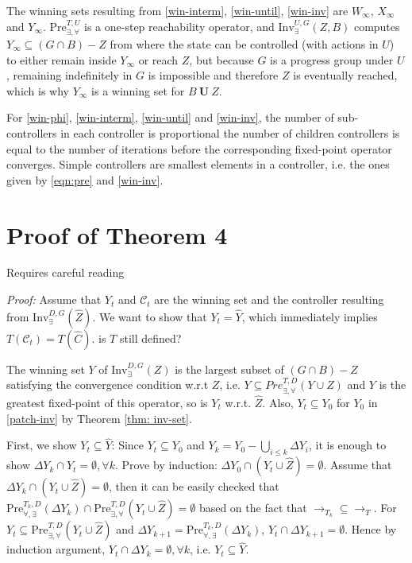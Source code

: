 The winning sets {\color{black} resulting from} \eqref{win-interm}, \eqref{win-until}, \eqref{win-inv} are $ W_{\infty} $, $ X_{\infty} $ and $ Y_{\infty} $. {\color{black} $\text{Pre}_{\exists,\forall}^{T,U}$ is a one-step reachability operator, and $\text{Inv}_{\exists}^{U,G}(Z,B)$ computes $Y_\infty \subseteq (G\cap B) - Z$ from where the state can be controlled (with actions in $U$) to either remain inside $Y_\infty$ or reach $Z$, but because $G$ is a progress group under $U$, remaining indefinitely in $G$ is impossible and therefore $Z$ is
	eventually reached, which is why $Y_\infty$ is a winning set for $B\mathbf{\ U\ }Z$.}
    
    For \eqref{win-phi}, \eqref{win-interm}, \eqref{win-until} and \eqref{win-inv}, the number of sub-controllers in each controller is proportional 
    {\color{purple} the number of children controllers is equal} 
    to the number of iterations before the corresponding fixed-point operator converges. Simple controllers are smallest elements in a controller, i.e. the ones given by \eqref{eqn:pre} and \eqref{win-inv}. 
    
    \section{Proof of Theorem 4}\label{app:pr-31}
    
    {\color{red} Requires careful reading}

\emph{Proof:} Assume that $ Y_t $ and $ \mathcal{C}_t $ are the winning set and the controller resulting from $ \text{Inv}_{\exists}^{D,G} (\widehat{Z}) $. We want to show that $ Y_t=\widehat{Y}$, which immediately implies $ T(\mathcal{C}_t) = T(\widehat{C}) $. {\color{red} is $T$ still defined?}
	
The winning set $ Y $ of $ \text{Inv}_{\exists}^{D,G} (Z) $ is the largest subset of $ (G\cap B) - Z  $ satisfying the convergence condition w.r.t $ Z $, i.e. $ Y \subseteq Pre^{T,D}_{\exists, \forall}(Y\cup Z) $ and $Y$ is the greatest fixed-point of this operator, so is $ Y_t $ w.r.t. $ \widehat{Z} $. Also, $ Y_t \subseteq Y_0 $ for $ Y_0 $ in \eqref{patch-inv} by Theorem \ref{thm: inv-set}. 
	
	First, we show $ Y_t \subseteq \widehat{Y} $: Since $ Y_t\subseteq Y_0 $ and $ Y_k = Y_0 - \bigcup_{i\leq k} \Delta Y_i$, it is enough to show $ \Delta Y_k\cap Y_t = \emptyset,\forall k $. Prove by induction: $ \Delta Y_0\cap (Y_t\cup \widehat{Z}) = \emptyset $. Assume that $ \Delta Y_k \cap (Y_t\cup \widehat{Z}) = \emptyset $, then it can be easily checked that $\text{Pre}_{\forall, \exists}^{T_k,D}(\Delta Y_k) \cap  \text{Pre}_{\exists,\forall}^{T,D} (Y_t\cup \widehat{Z}) = \emptyset$ based on the fact that	 $ \rightarrow_{T_k}\subseteq \rightarrow_{T} $. For $ Y_t \subseteq \text{Pre}_{\exists,\forall}^{T,D} (Y_t\cup \widehat{Z}) $ and $ \Delta Y_{k+1} = \text{Pre}_{\forall, \exists}^{T_k,D}(\Delta Y_k) $, $ Y_t\cap \Delta Y_{k+1} = \emptyset $. Hence by induction argument, $ Y_t \cap \Delta Y_k = \emptyset, \forall k $, i.e. $ Y_t\subseteq \widehat{Y} $. 
	
